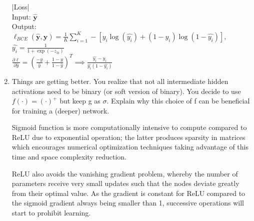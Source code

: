 \documentclass{article}
\begin{document}
\begin{enumerate}
      \begin{tcolorbox}
          |Loss|\\
          Input: $\bm{\hat{y}}$\\
          Output: $\ell_{BCE}(\bm{\hat{y},y})=\frac{1}{K}\sum_{i=1}^{K}-[y_i\log(\hat{y_i})+(1-y_i)\log(1-\hat{y_i})],$\\
          $\hat{y_i}=\frac{1}{1+\exp(-z_{3i})}$\\
          $\frac{\partial \ell}{\partial \hat{y}}=(\frac{-y}{\hat{y}}+\frac{1-y}{1-\hat{y}})^T\implies\frac{\hat{y_i}-y_i}{\hat{y_i}(1-\hat{y_i})}$
      \end{tcolorbox}
  \item Things are getting better. You realize that not all intermediate hidden activations need to be binary (or soft version of binary). You decide to use $f(\cdot)=(\cdot)^{+}$ but keep g as $\sigma$. Explain why this choice of f can be beneficial for training a (deeper) network.
      \begin{tcolorbox}
        Sigmoid function is more computationally intensive to compute compared to ReLU due to exponential operation; the latter produces sparsity in matrices which encourages numerical optimization techniques taking advantage of this time and space complexity reduction. 
      \end{tcolorbox}
      \begin{tcolorbox}
        ReLU also avoids the vanishing gradient problem, whereby the number of parameters receive very small updates such that the nodes deviate greatly from their optimal value. As the gradient is constant for ReLU compared to the sigmoid gradient always being smaller than 1, successive operations will start to prohibit learning.
      \end{tcolorbox}
\end{enumerate}
\end{document}
